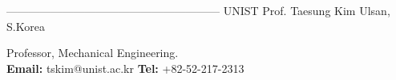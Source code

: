 \begin{cventries}
---------------------------------------------------------
  \cventry
    {UNIST} %
    {Prof. Taesung Kim} %
    {Ulsan, S.Korea} %
    {} %
    {
      \begin{cvitems} %
        Professor, Mechanical Engineering.\\
        \textbf{Email:} tskim@unist.ac.kr \textbf{Tel:} +82-52-217-2313
      \end{cvitems}
    }





\end{cventries}
